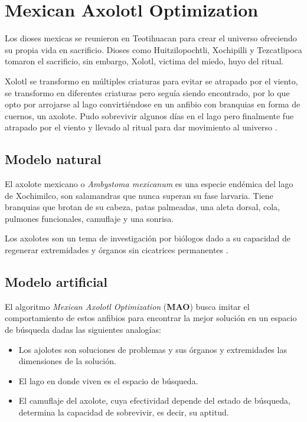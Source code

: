 \chapter{Mexican Axolotl Optimization}

Los dioses mexicas se reunieron en Teotihuacan para crear el universo ofreciendo su propia vida en sacrificio. Dioses como Huitzilopochtli, Xochipilli y Tezcatlipoca tomaron el sacrificio, sin embargo, Xolotl, victima del miedo, huyo del ritual. 

Xolotl se transformo en múltiples criaturas para evitar se atrapado por el viento, se transformo en diferentes criaturas pero seguía siendo encontrado, por lo que opto por arrojarse al lago convirtiéndose en un anfibio con branquias en forma de cuernos, un axolote. Pudo sobrevivir algunos días en el lago pero finalmente fue atrapado por el viento y llevado al ritual para dar movimiento al universo \cite{leyenda}.

\section{Modelo natural}

El axolote mexicano o \textit{Ambystoma mexicanum} es una especie endémica del lago de Xochimilco, son salamandras que nunca superan su fase larvaria. Tiene branquias que brotan de su cabeza, patas palmeadas, una aleta dorsal, cola, pulmones funcionales, camuflaje y una sonrisa.

Los axolotes son un tema de investigación por biólogos dado a su capacidad de regenerar extremidades y órganos sin cicatrices permanentes \cite{axolote}.

\section{Modelo artificial}

 El algoritmo \textit{Mexican Axolotl Optimization} (\textbf{MAO}) busca imitar el comportamiento de estos anfibios para encontrar la mejor solución en un espacio de búsqueda dadas las siguientes analogías:
 
 \begin{itemize}
 	\item Los ajolotes son soluciones de problemas y sus órganos y extremidades las dimensiones de la solución.
 	\item El lago en donde viven es el espacio de búsqueda.
 	\item El camuflaje del axolote, cuya efectividad depende del estado de búsqueda, determina la capacidad de sobrevivir, es decir, su aptitud.
 \end{itemize}
 
